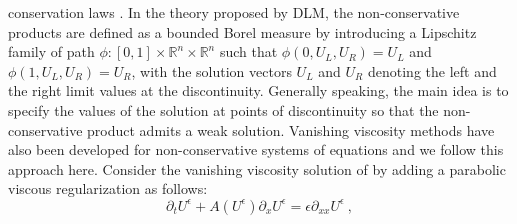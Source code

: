 \documentclass[times,doublespace]{fldauth}%
\begin{document}
conservation laws \cite{Lax}. In the theory proposed by DLM, the non-conservative products are defined as a bounded Borel 
measure by introducing a Lipschitz family of path $\phi: [0,1] \times \mathbb{R}^n \times \mathbb{R}^n$ such that 
$\phi(0, U_L, U_R) = U_L$ and $\phi(1, U_L, U_R) = U_R$, with the solution vectors $U_L$ and $U_R$ denoting the left and the right limit values at the discontinuity. 
Generally speaking, the main idea is to specify the values of the solution at points of discontinuity so that the non-conservative product admits a weak solution.
%
%
Vanishing viscosity methods have also been developed for non-conservative systems of equations \cite{bianchini_bressan_2005,alouges_merlet_2004,lefloch_1988} 
and we follow this approach here.
Consider the  vanishing viscosity solution of  by adding a parabolic viscous regularization as follows:
%
\begin{equation}
\label{eq:nc-syst-eq-visc}
\partial_t U^\epsilon + A(U^\epsilon) \partial_x U^\epsilon = \epsilon \partial_{xx} U^\epsilon \ , \nonumber
\end{equation}
\end{document}
